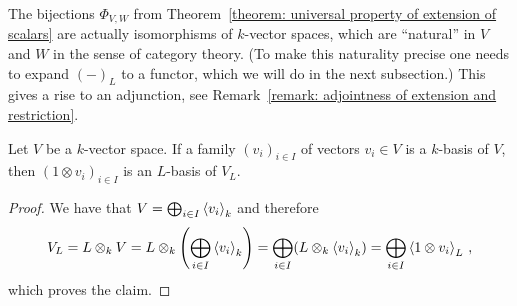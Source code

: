 \begin{remark}
  The bijections $\Phi_{V,W}$ from Theorem~\ref{theorem: universal property of extension of scalars} are actually isomorphisms of $k$-vector spaces, which are \enquote{natural} in $V$ and $W$ in the sense of category theory.
  (To make this naturality precise one needs to expand $(-)_L$ to a functor, which we will do in the next subsection.)
  This gives a rise to an adjunction, see Remark~\ref{remark: adjointness of extension and restriction}.
\end{remark}


\begin{lemma}
  \label{lemma: bases under extension of scalars}
  Let $V$ be a $k$-vector space.
  If a family $(v_i)_{i \in I}$ of vectors $v_i \in V$ is a $k$-basis of $V$, then $(1 \otimes v_i)_{i \in I}$ is an $L$-basis of $V_L$.
\end{lemma}


\begin{proof}
  We have that $V = \bigoplus_{i \in I} \left\langle v_i \right\rangle_k$ and therefore
  \[
      V_L
    = L \otimes_k V
    = L \otimes_k \left( \bigoplus_{i \in I} \left\langle v_i \right\rangle_k \right)
    = \bigoplus_{i \in I} (L \otimes_k \left\langle v_i \right\rangle_k)
    = \bigoplus_{i \in I} \left\langle 1 \otimes v_i \right\rangle_L \,,
  \]
  which proves the claim.
\end{proof}


